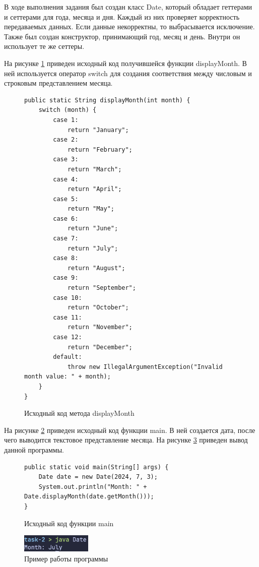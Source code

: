 \documentclass[a4paper, 14pt]{extarticle}
\begin{document}
В ходе выполнения задания был создан класс Date, который обладает геттерами и
сеттерами для года, месяца и дня. Каждый из них проверяет корректность
передаваемых данных. Если данные некорректны, то выбрасывается исключение. Также
был создан конструктор, принимающий год, месяц и день. Внутри он использует те
же сеттеры.

На рисунке \ref{fig:task-2-1} приведен исходный код получившейся функции
\foreignlanguage{english}{displayMonth}. В ней используется оператор
\foreignlanguage{english}{switch} для создания соответствия между числовым и
строковым представлением месяца.

\begin{figure}[H]
  \centering
  \begin{verbatim}
public static String displayMonth(int month) {
    switch (month) {
        case 1:
            return "January";
        case 2:
            return "February";
        case 3:
            return "March";
        case 4:
            return "April";
        case 5:
            return "May";
        case 6:
            return "June";
        case 7:
            return "July";
        case 8:
            return "August";
        case 9:
            return "September";
        case 10:
            return "October";
        case 11:
            return "November";
        case 12:
            return "December";
        default:
            throw new IllegalArgumentException("Invalid month value: " + month);
    }
}
\end{verbatim}
  \caption{Исходный код метода displayMonth}
  \label{fig:task-2-1}
\end{figure}

На рисунке \ref{fig:task-2-2} приведен исходный код функции
\foreignlanguage{english}{main}. В ней создается дата, после чего выводится
текстовое представление месяца. На рисунке \ref{fig:task-2-3} приведен вывод
данной программы.

\begin{figure}[H]
  \centering
  \begin{verbatim}
public static void main(String[] args) {
    Date date = new Date(2024, 7, 3);
    System.out.println("Month: " + Date.displayMonth(date.getMonth()));
}
  \end{verbatim}
  \caption{Исходный код функции main}
  \label{fig:task-2-2}
\end{figure}

\begin{figure}[H]
  \centering
  \includegraphics[width=0.3\textwidth]{images/task-2.png}
  \caption{Пример работы программы}
  \label{fig:task-2-3}
\end{figure}
\end{document}
